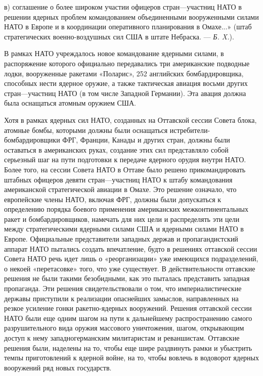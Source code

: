 \documentclass[12pt, a4paper, openany]{book}
\begin{document}
в) соглашение о более широком участии офицеров стран—участниц НАТО в решении ядерных проблем командованием объединенными вооруженными силами НАТО в Европе и в координации оперативного планирования в Омахе...» (штаб стратегических военно-воздушных сил США в штате Небраска. — \textit{Б. X.}).

В рамках НАТО учреждалось новое командование ядерными силами, в распоряжение которого официально передавались три американские подводные лодки, вооруженные ракетами «Поларис», 252 английских бомбардировщика, способных нести ядерное оружие, а также тактическая авиация восьми других стран—участниц НАТО (в том числе Западной Германии). Эта авация должна была оснащаться атомным оружием США.

Хотя в рамках ядерных сил НАТО, созданных на Оттавской сессии Совета блока, атомные бомбы, которыми должны были оснащаться истребители-бомбардировщики ФРГ, Франции, Канады и других стран, должны были оставаться в американских руках, создание этих сил представляло собой серьезный шаг на пути подготовки к передаче ядерного орудия внутри НАТО. Более того, на сессии Совета НАТО в Оттаве было решено прикомандировать штабных офицеров девяти стран—участниц НАТО к штабу командования американской стратегической авиации в Омахе. Это решение означало, что европейские члены НАТО, включая ФРГ, должны были допускаться к определению порядка боевого применения американских межконтинентальных ракет и бомбардировщиков, намечать для них цели и распределять эти цели между стратегическими ядерными силами США и ядерными силами НАТО в Европе. Официальные представители западных держав и пропагандистский аппарат НАТО пытались создать впечатление, будто в решениях оттавской сессии Совета НАТО речь идет лишь о «реорганизации» уже имеющихся подразделений, о некоей «перетасовке» того, что уже существует. В действительности оттавские решения не были такими безобидными, как это пыталась представить западная пропаганда. Эти решения свидетельствовали о том, что империалистические державы приступили к реализации опаснейших замыслов, направленных на резкое усиление гонки ракетно-ядерных вооружений. Решения оттавской сессии НАТО были еще одним шагом на пути к дальнейшему распространению самого разрушительного вида оружия массового уничтожения, шагом, открывающим доступ к нему западногерманским милитаристам и реваншистам. Оттавские решения были, наделены на то, чтобы еще шире раздвинуть рамки и убыстрить темпы приготовлений к ядерной войне, на то, чтобы вовлечь в водоворот ядерных вооружений ряд новых государств.
\end{document}
